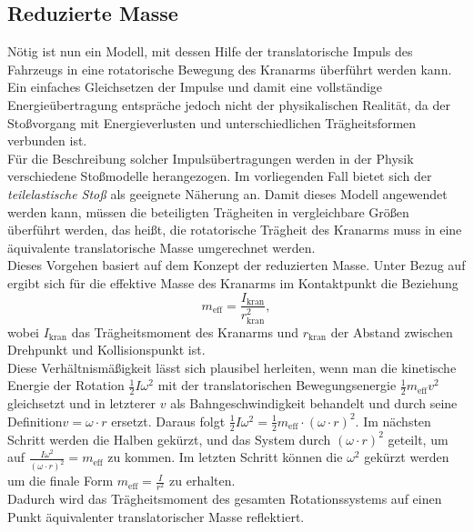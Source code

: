 \subsection{Reduzierte Masse}
Nötig ist nun ein Modell, mit dessen Hilfe der translatorische Impuls des Fahrzeugs in eine rotatorische Bewegung des Kranarms überführt werden kann. Ein einfaches Gleichsetzen der Impulse und damit eine vollständige Energieübertragung entspräche jedoch nicht der physikalischen Realität, da der Stoßvorgang mit Energieverlusten und unterschiedlichen Trägheitsformen verbunden ist.
\\
Für die Beschreibung solcher Impulsübertragungen werden in der Physik verschiedene Stoßmodelle herangezogen. Im vorliegenden Fall bietet sich der \textit{teilelastische Stoß} als geeignete Näherung an. Damit dieses Modell angewendet werden kann, müssen die beteiligten Trägheiten in vergleichbare Größen überführt werden, das heißt, die rotatorische Trägheit des Kranarms muss in eine äquivalente translatorische Masse umgerechnet werden.
\\
Dieses Vorgehen basiert auf dem Konzept der reduzierten Masse. Unter Bezug auf \parencite{kuchling_red-masse} ergibt sich für die effektive Masse des Kranarms im Kontaktpunkt die Beziehung
\[
m_{\text{eff}} = \frac{I_{\text{kran}}}{r_{\text{kran}}^{2}},
\]
wobei $I_{\text{kran}}$ das Trägheitsmoment des Kranarms und $r_{\text{kran}}$ der Abstand zwischen Drehpunkt und Kollisionspunkt ist.
\\
Diese Verhältnismäßigkeit lässt sich plausibel herleiten, wenn man die kinetische Energie der Rotation $\tfrac{1}{2} I \omega^2$ mit der translatorischen Bewegungsenergie $\tfrac{1}{2} m_{\text{eff}} v^2$ gleichsetzt und in letzterer $v$ als Bahngeschwindigkeit behandelt und durch seine Definition\(v = \omega \cdot r\) ersetzt. Daraus folgt $\tfrac{1}{2} I \omega^2 =\tfrac{1}{2} m_{\text{eff}} \cdot (\omega \cdot r)^2$. Im nächsten Schritt werden die Halben gekürzt, und das System durch $(\omega \cdot r)^2$ geteilt, um auf $\frac{I \omega^2}{(\omega \cdot r)^2} = m_{\text{eff}}$ zu kommen. Im letzten Schritt können die $\omega^2$ gekürzt werden um die finale Form $m_{\text{eff}} = \frac{I}{r^2}$ zu erhalten. 
\\
Dadurch wird das Trägheitsmoment des gesamten Rotationssystems auf einen Punkt äquivalenter translatorischer Masse reflektiert.

